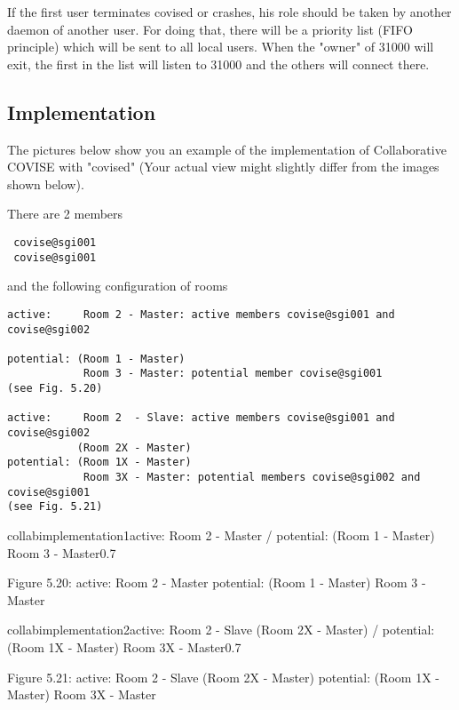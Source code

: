 If the first user terminates covised or crashes, his role should be taken by another 
daemon of another user. For doing that, there will be a priority list (FIFO principle) 
which will be sent to all local users.  When the "owner" of 31000 will exit, the 
first in the list will listen to 31000 and the others will connect there.   

\clearpage

\subsection{Implementation}

The pictures below show you an example of the implementation of Collaborative
COVISE with "covised" (Your actual view might slightly differ from the images shown below).


There are 2 members
\begin{verbatim}
 covise@sgi001 
 covise@sgi001
\end{verbatim}
and the following configuration of rooms
\begin{verbatim}
active:     Room 2 - Master: active members covise@sgi001 and covise@sgi002

potential: (Room 1 - Master) 
            Room 3 - Master: potential member covise@sgi001 
(see Fig. 5.20)

active:     Room 2  - Slave: active members covise@sgi001 and covise@sgi002  
           (Room 2X - Master)    
potential: (Room 1X - Master) 
            Room 3X - Master: potential members covise@sgi002 and covise@sgi001
(see Fig. 5.21) 
\end{verbatim}

\begin{covimg}{collab}{implementation1}{active: Room 2 - Master / potential: (Room 1 - Master) Room 3 - Master}{0.7}\end{covimg}
\begin{htmlonly}
Figure 5.20: \newline
active:     Room 2 - Master \newline
potential: (Room 1 - Master) Room 3 - Master   
\vspace{0.5cm}
\end{htmlonly}

\begin{covimg}{collab}{implementation2}{active: Room 2  - Slave (Room 2X - Master) / potential: (Room 1X -
Master) Room 3X - Master}{0.7}\end{covimg}
\begin{htmlonly}
Figure 5.21: \newline
active:     Room 2  - Slave  (Room 2X - Master) \newline   
potential: (Room 1X - Master) Room 3X - Master   
\vspace{0.5cm}
\end{htmlonly}

